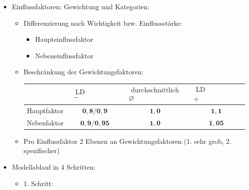 \documentclass[fleqn,twoside,dvipsnames]{article}
\begin{document}
\begin{itemize}
\begin{itemize}
                    \item Einflussfaktoren: Gewichtung und Kategorien:
                        \begin{itemize}
                            \item Differenzierung nach Wichtigkeit bzw. Einflussstärke:
                                \begin{itemize}
                                    \item Haupteinflussfaktor
                                    \item Nebeneinflussfaktor
                                \end{itemize}
                            \item Beschränkung der Gewichtungsfaktoren:\\
                                \begin{tabular}{|l|c|c|c|}
                                \cline { 2 - 4 } \multicolumn{1}{c|}{} & $\begin{array}{c}\text { LD verkürzend } \\
                                -\end{array}$ & $\begin{array}{c}\text { durchschnittlich } \\
                                \varnothing\end{array}$ & $\begin{array}{c}\text { LD verlängernd } \\
                                +\end{array}$ \\
                                \hline Hauptfaktor & $\mathbf{0 , 8} / \mathbf{0 , 9}$ & $\mathbf{1 , 0}$ & $\mathbf{1,1}$ \\
                                \hline Nebenfaktor & $\mathbf{0 , 9} / \mathbf{0,95}$ & $\mathbf{1 , 0}$ & $\mathbf{1 , 0 5}$ \\
                                \hline
                                \end{tabular}
                            \item Pro Einflussfaktor 2 Ebenen an Gewichtungsfaktoren (1. sehr grob, 2. spezifischer)
                        \end{itemize}
                    \item Modellablauf in 4 Schritten:
                        \begin{itemize}
                            \item 1. Schritt: 

\end{itemize}
\end{itemize}
\end{itemize}
\end{document}
